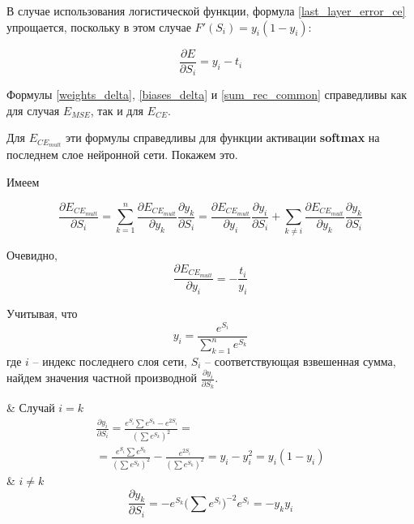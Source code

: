 В случае использования логистической функции, формула \ref{last_layer_error_ce} упрощается, поскольку в этом случае $F'(S_i)=y_i(1-y_i)$:

\begin{equation}
	\frac{\partial E}{\partial S_i} = y_i - t_i
\end{equation}

Формулы \ref{weights_delta}, \ref{biases_delta} и \ref{sum_rec_common} справедливы как для случая $E_{MSE}$, так и для $E_{CE}$.

Для $E_{CE_{mult}}$ эти формулы справедливы для функции активации \textbf{softmax} на последнем слое нейронной сети. Покажем это.

Имеем

\begin{equation}
	\label{common_E}
	\frac{\partial E_{CE_{mult}}}{\partial S_i} = \sum_{k=1}^{n} \frac{\partial E_{CE_{mult}}}{\partial y_k}\frac{\partial y_k}{\partial S_i} = \frac{\partial E_{CE_{mult}}}{\partial y_i}\frac{\partial y_i}{\partial S_i} + \sum_{k\neq i}\frac{\partial E_{CE_{mult}}}{\partial y_k}\frac{\partial y_k}{\partial S_i}
\end{equation}

Очевидно, 
\begin{equation}
\label{part_deriv_y}
\frac{\partial E_{CE_{mult}}}{\partial y_i} = -\frac{t_i}{y_i}
\end{equation}

Учитывая, что
\begin{equation}
	y_i = \frac{e^{S_i}}{\sum_{k=1}^{n} e^{S_k}}
\end{equation}
где $i$ -- индекс последнего слоя сети, $S_i$ -- соответствующая взвешенная сумма, найдем значения частной производной $\frac{\partial y_i}{\partial S_k}$.
\begin{easylistNum}
	& Случай $i = k$
	\begin{multline}
		\label{part1_deriv_S}
		\frac{\partial y_i}{\partial S_i} = \frac{e^{S_i}\sum e^{S_k} - e^{2S_i}}{(\sum e^{S_k})^2} = \\ = \frac{e^{S_i}\sum e^{S_k}}{(\sum e^{S_k})^2}-\frac{e^{2S_i}}{(\sum e^{S_k})^2}=y_i - y_i^2 = y_i(1-y_i)
	\end{multline}
	& $i \neq k$
	\begin{equation}
		\label{part2_deriv_S}
		\frac{\partial y_k}{\partial S_i} = -e^{S_k}\Big(\sum e^{S_i}\Big)^{-2}e^{S_i} = -y_ky_i
	\end{equation}
\end{easylistNum}

